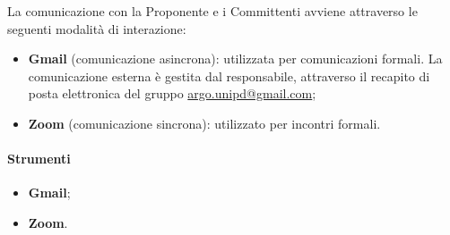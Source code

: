 \par La comunicazione con la Proponente e i Committenti avviene attraverso le seguenti modalità di interazione:
\begin{itemize}
  \item \textbf{Gmail} (comunicazione asincrona): utilizzata per comunicazioni formali. La comunicazione esterna è gestita dal responsabile, attraverso il recapito di posta elettronica del gruppo \href{mailto:argo.unipd@gmail.com}{argo.unipd\-@\-gmail.com};
  \item \textbf{Zoom} (comunicazione sincrona): utilizzato per incontri formali.
\end{itemize}

\paragraph*{Strumenti}
\begin{itemize}
  \item \textbf{Gmail};
  \item \textbf{Zoom}.
\end{itemize}
